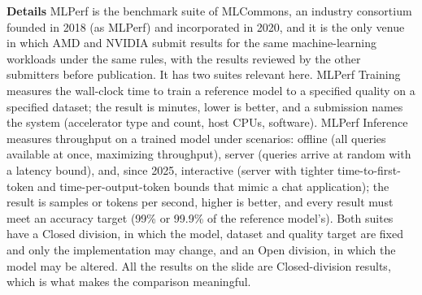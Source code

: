 \documentclass[11pt,letterpaper]{article}
\newcommand{\para}[1]{\medskip\noindent\textbf{#1}\quad}
\begin{document}
\para{Details} MLPerf is the benchmark suite of MLCommons, an industry consortium founded in 2018 (as MLPerf) and incorporated in 2020, and it is the only venue in which AMD and NVIDIA submit results for the same machine-learning workloads under the same rules, with the results reviewed by the other submitters before publication. It has two suites relevant here. MLPerf Training measures the wall-clock time to train a reference model to a specified quality on a specified dataset; the result is minutes, lower is better, and a submission names the system (accelerator type and count, host CPUs, software). MLPerf Inference measures throughput on a trained model under scenarios: offline (all queries available at once, maximizing throughput), server (queries arrive at random with a latency bound), and, since 2025, interactive (server with tighter time-to-first-token and time-per-output-token bounds that mimic a chat application); the result is samples or tokens per second, higher is better, and every result must meet an accuracy target (99\% or 99.9\% of the reference model's). Both suites have a Closed division, in which the model, dataset and quality target are fixed and only the implementation may change, and an Open division, in which the model may be altered. All the results on the slide are Closed-division results, which is what makes the comparison meaningful.
\end{document}
